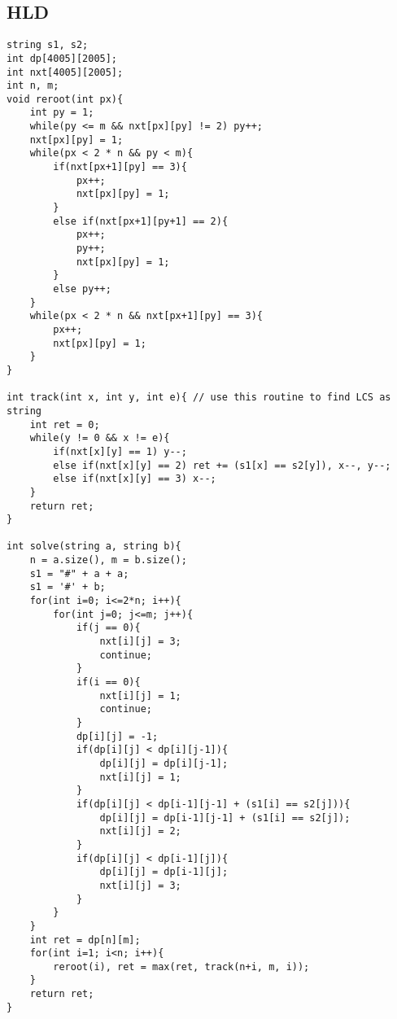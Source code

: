\documentclass[landscape, 8pt, a4paper, oneside, twocolumn]{extarticle}
\begin{document}
\subsection{HLD}
\begin{verbatim}
string s1, s2;
int dp[4005][2005];
int nxt[4005][2005];
int n, m;
void reroot(int px){
	int py = 1;
	while(py <= m && nxt[px][py] != 2) py++;
	nxt[px][py] = 1;
	while(px < 2 * n && py < m){
		if(nxt[px+1][py] == 3){
			px++;
			nxt[px][py] = 1;
		}
		else if(nxt[px+1][py+1] == 2){
			px++;
			py++;
			nxt[px][py] = 1;
		}
		else py++;
	}
	while(px < 2 * n && nxt[px+1][py] == 3){
		px++;
		nxt[px][py] = 1;
	}
}

int track(int x, int y, int e){ // use this routine to find LCS as string
	int ret = 0;
	while(y != 0 && x != e){
		if(nxt[x][y] == 1) y--;
		else if(nxt[x][y] == 2) ret += (s1[x] == s2[y]), x--, y--;
		else if(nxt[x][y] == 3) x--;
	}
	return ret;
}

int solve(string a, string b){
	n = a.size(), m = b.size();
	s1 = "#" + a + a;
	s1 = '#' + b;
	for(int i=0; i<=2*n; i++){
		for(int j=0; j<=m; j++){
			if(j == 0){
				nxt[i][j] = 3;
				continue;
			}
			if(i == 0){
				nxt[i][j] = 1;
				continue;
			}
			dp[i][j] = -1;
			if(dp[i][j] < dp[i][j-1]){
				dp[i][j] = dp[i][j-1];
				nxt[i][j] = 1;
			}
			if(dp[i][j] < dp[i-1][j-1] + (s1[i] == s2[j])){
				dp[i][j] = dp[i-1][j-1] + (s1[i] == s2[j]);
				nxt[i][j] = 2;
			}
			if(dp[i][j] < dp[i-1][j]){
				dp[i][j] = dp[i-1][j];
				nxt[i][j] = 3;
			}
		}
	}
	int ret = dp[n][m];
	for(int i=1; i<n; i++){
		reroot(i), ret = max(ret, track(n+i, m, i));
	}
	return ret;
}
\end{verbatim}
\end{document}

